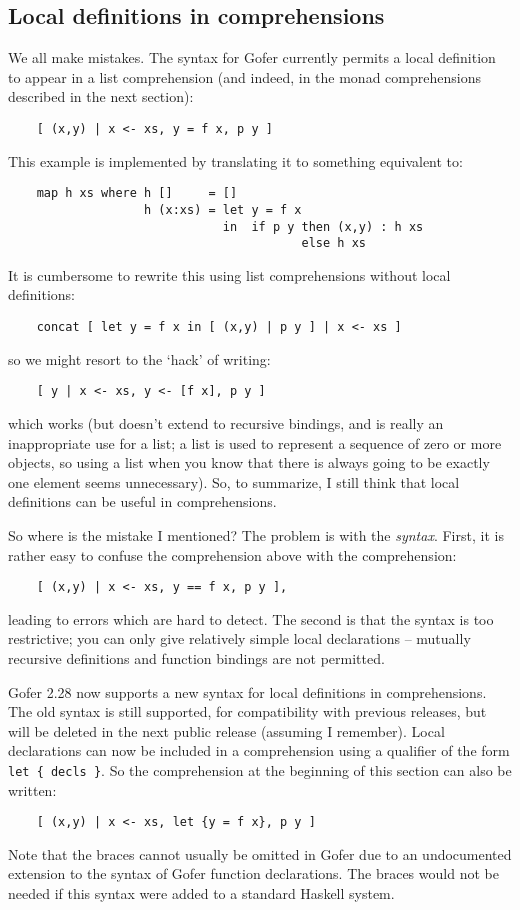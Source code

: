 \subsection{Local definitions in comprehensions}
We all make mistakes.  The syntax for Gofer currently permits a local
definition to appear in a list comprehension (and indeed, in the monad
comprehensions described in the next section):
\begin{verbatim}
    [ (x,y) | x <- xs, y = f x, p y ]
\end{verbatim}
This example is implemented by translating it to something equivalent
to:
\begin{verbatim}
    map h xs where h []     = []
                   h (x:xs) = let y = f x
                              in  if p y then (x,y) : h xs
                                         else h xs
\end{verbatim}
It is cumbersome to rewrite this using list comprehensions without
local definitions:
\begin{verbatim}
    concat [ let y = f x in [ (x,y) | p y ] | x <- xs ]
\end{verbatim}
so we might resort to the `hack' of writing:
\begin{verbatim}
    [ y | x <- xs, y <- [f x], p y ]
\end{verbatim}
which works (but doesn't extend to recursive bindings, and is really an
inappropriate use for a list; a list is used to represent a sequence of
zero or more objects, so using a list when you know that there is
always going to be exactly one element seems unnecessary).  So, to
summarize, I still think that local definitions can be useful in
comprehensions.

So where is the mistake I mentioned?  The problem is with the {\em syntax}.
First, it is rather easy to confuse the comprehension above with the
comprehension:
\begin{verbatim}
    [ (x,y) | x <- xs, y == f x, p y ],
\end{verbatim}
leading to errors which are hard to detect.  The second is that the
syntax is too restrictive; you can only give relatively simple local
declarations -- mutually recursive definitions and function bindings
are not permitted.

Gofer 2.28 now supports a new syntax for local definitions in
comprehensions.  The old syntax is still supported, for compatibility
with previous releases, but will be deleted in the next public release
(assuming I remember).  Local declarations can now be included in a
comprehension using a qualifier of the form \verb"let { decls }".  So the
comprehension at the beginning of this section can also be written:
\begin{verbatim}
    [ (x,y) | x <- xs, let {y = f x}, p y ]
\end{verbatim}
Note that the braces cannot usually be omitted in Gofer due to an
undocumented extension to the syntax of Gofer function declarations.
The braces would not be needed if this syntax were added to a standard
Haskell system.

